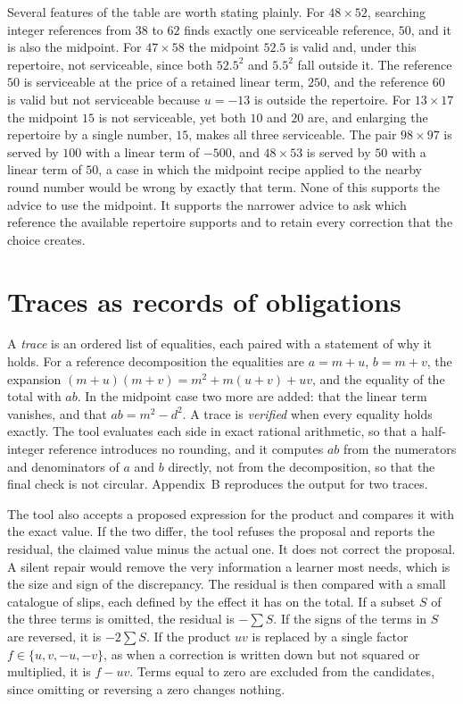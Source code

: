 \documentclass[11pt]{article}
\theoremstyle{definition}
\theoremstyle{remark}
\begin{document}
Several features of the table are worth stating plainly. For $48\times 52$, searching integer references from $38$ to $62$ finds exactly one serviceable reference, $50$, and it is also the midpoint. For $47\times 58$ the midpoint $52.5$ is valid and, under this repertoire, not serviceable, since both $52.5^2$ and $5.5^2$ fall outside it. The reference $50$ is serviceable at the price of a retained linear term, $250$, and the reference $60$ is valid but not serviceable because $u=-13$ is outside the repertoire. For $13\times 17$ the midpoint $15$ is not serviceable, yet both $10$ and $20$ are, and enlarging the repertoire by a single number, $15$, makes all three serviceable. The pair $98\times 97$ is served by $100$ with a linear term of $-500$, and $48\times 53$ is served by $50$ with a linear term of $50$, a case in which the midpoint recipe applied to the nearby round number would be wrong by exactly that term. None of this supports the advice to use the midpoint. It supports the narrower advice to ask which reference the available repertoire supports and to retain every correction that the choice creates.

\section{Traces as records of obligations}

A \emph{trace} is an ordered list of equalities, each paired with a statement of why it holds. For a reference decomposition the equalities are $a=m+u$, $b=m+v$, the expansion $(m+u)(m+v)=m^2+m(u+v)+uv$, and the equality of the total with $ab$. In the midpoint case two more are added: that the linear term vanishes, and that $ab=m^2-d^2$. A trace is \emph{verified} when every equality holds exactly. The tool evaluates each side in exact rational arithmetic, so that a half-integer reference introduces no rounding, and it computes $ab$ from the numerators and denominators of $a$ and $b$ directly, not from the decomposition, so that the final check is not circular. Appendix~B reproduces the output for two traces.

The tool also accepts a proposed expression for the product and compares it with the exact value. If the two differ, the tool refuses the proposal and reports the residual, the claimed value minus the actual one. It does not correct the proposal. A silent repair would remove the very information a learner most needs, which is the size and sign of the discrepancy. The residual is then compared with a small catalogue of slips, each defined by the effect it has on the total. If a subset $S$ of the three terms is omitted, the residual is $-\sum S$. If the signs of the terms in $S$ are reversed, it is $-2\sum S$. If the product $uv$ is replaced by a single factor $f\in\{u,v,-u,-v\}$, as when a correction is written down but not squared or multiplied, it is $f-uv$. Terms equal to zero are excluded from the candidates, since omitting or reversing a zero changes nothing.
\end{document}
